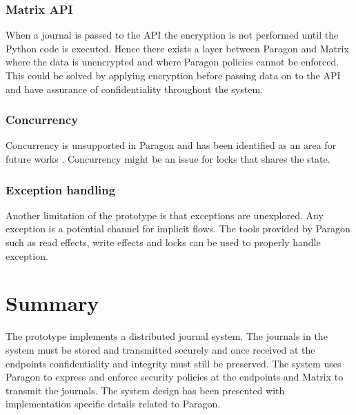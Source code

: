 \subsubsection{Matrix API}

When a journal is passed to the API the encryption is not performed until the Python code is executed. Hence there exists a layer between Paragon and Matrix where the data is unencrypted and where Paragon policies cannot be enforced. This could be solved by applying encryption before passing data on to the API and have assurance of confidentiality throughout the system.

\subsubsection{Concurrency}
Concurrency is unsupported in Paragon and has been identified as an area for future works \cite{paragonprogramming}. Concurrency might be an issue for locks that shares the state.

\subsubsection{Exception handling}
Another limitation of the prototype is that exceptions are unexplored. Any exception is a potential channel for implicit flows. The tools provided by Paragon such as read effects, write effects and locks can be used to properly handle exception.


\section{Summary}
The prototype implements a distributed journal system. The journals in the system must be stored and transmitted securely and once received at the endpoints confidentiality and integrity must still be preserved. The system uses Paragon to express and enforce security policies at the endpoints and Matrix to transmit the journals. The system design has been presented with implementation specific details related to Paragon. 